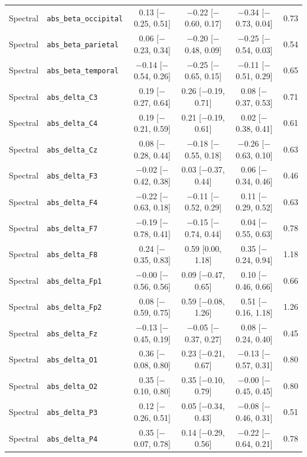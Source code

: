 {\begin{longtable}{llcccc}
Spectral & \texttt{abs\_beta\_occipital} & 0.13 [$-$0.25, 0.51] & $-$0.22 [$-$0.60, 0.17] & $-$0.34 [$-$0.73, 0.04] & 0.73 \\
Spectral & \texttt{abs\_beta\_parietal} & 0.06 [$-$0.23, 0.34] & $-$0.20 [$-$0.48, 0.09] & $-$0.25 [$-$0.54, 0.03] & 0.54 \\
Spectral & \texttt{abs\_beta\_temporal} & $-$0.14 [$-$0.54, 0.26] & $-$0.25 [$-$0.65, 0.15] & $-$0.11 [$-$0.51, 0.29] & 0.65 \\
Spectral & \texttt{abs\_delta\_C3} & 0.19 [$-$0.27, 0.64] & 0.26 [$-$0.19, 0.71] & 0.08 [$-$0.37, 0.53] & 0.71 \\
Spectral & \texttt{abs\_delta\_C4} & 0.19 [$-$0.21, 0.59] & 0.21 [$-$0.19, 0.61] & 0.02 [$-$0.38, 0.41] & 0.61 \\
Spectral & \texttt{abs\_delta\_Cz} & 0.08 [$-$0.28, 0.44] & $-$0.18 [$-$0.55, 0.18] & $-$0.26 [$-$0.63, 0.10] & 0.63 \\
Spectral & \texttt{abs\_delta\_F3} & $-$0.02 [$-$0.42, 0.38] & 0.03 [$-$0.37, 0.44] & 0.06 [$-$0.34, 0.46] & 0.46 \\
Spectral & \texttt{abs\_delta\_F4} & $-$0.22 [$-$0.63, 0.18] & $-$0.11 [$-$0.52, 0.29] & 0.11 [$-$0.29, 0.52] & 0.63 \\
Spectral & \texttt{abs\_delta\_F7} & $-$0.19 [$-$0.78, 0.41] & $-$0.15 [$-$0.74, 0.44] & 0.04 [$-$0.55, 0.63] & 0.78 \\
Spectral & \texttt{abs\_delta\_F8} & 0.24 [$-$0.35, 0.83] & 0.59 [0.00, 1.18] & 0.35 [$-$0.24, 0.94] & 1.18 \\
Spectral & \texttt{abs\_delta\_Fp1} & $-$0.00 [$-$0.56, 0.56] & 0.09 [$-$0.47, 0.65] & 0.10 [$-$0.46, 0.66] & 0.66 \\
Spectral & \texttt{abs\_delta\_Fp2} & 0.08 [$-$0.59, 0.75] & 0.59 [$-$0.08, 1.26] & 0.51 [$-$0.16, 1.18] & 1.26 \\
Spectral & \texttt{abs\_delta\_Fz} & $-$0.13 [$-$0.45, 0.19] & $-$0.05 [$-$0.37, 0.27] & 0.08 [$-$0.24, 0.40] & 0.45 \\
Spectral & \texttt{abs\_delta\_O1} & 0.36 [$-$0.08, 0.80] & 0.23 [$-$0.21, 0.67] & $-$0.13 [$-$0.57, 0.31] & 0.80 \\
Spectral & \texttt{abs\_delta\_O2} & 0.35 [$-$0.10, 0.80] & 0.35 [$-$0.10, 0.79] & $-$0.00 [$-$0.45, 0.45] & 0.80 \\
Spectral & \texttt{abs\_delta\_P3} & 0.12 [$-$0.26, 0.51] & 0.05 [$-$0.34, 0.43] & $-$0.08 [$-$0.46, 0.31] & 0.51 \\
Spectral & \texttt{abs\_delta\_P4} & 0.35 [$-$0.07, 0.78] & 0.14 [$-$0.29, 0.56] & $-$0.22 [$-$0.64, 0.21] & 0.78 \\

\end{longtable}}
